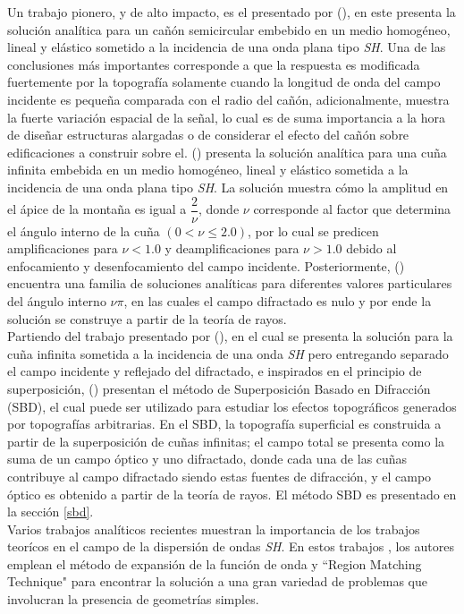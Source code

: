 \documentclass[spanish,letterpaper,12pt,twoside,openany]{article}
\begin{document}
Un trabajo pionero, y de alto impacto, es el presentado por \citeauthor{Trifunac1973} (\citeyear{Trifunac1973}), en este presenta la solución analítica para un cañón semicircular embebido en un medio homogéneo, lineal y elástico sometido a la incidencia de una onda plana tipo \textit{SH}. Una de las conclusiones más importantes corresponde a que la respuesta es modificada fuertemente por la topografía solamente cuando la longitud de onda del campo incidente es pequeña comparada con el radio del cañón, adicionalmente, muestra la fuerte variación espacial de la señal, lo cual es de suma importancia a la hora de diseñar estructuras alargadas o de considerar el efecto del cañón sobre edificaciones a construir sobre el. \citeauthor{SanchezSesma1985} (\citeyear{SanchezSesma1985}) presenta la solución analítica para una cuña infinita embebida en un medio homogéneo, lineal y elástico sometida a la incidencia de una onda plana tipo \textit{SH}. La solución muestra cómo la amplitud en el ápice de la montaña es igual a $\dfrac{2}{\nu}$, donde $\nu$ corresponde al factor que determina el ángulo interno de la cuña $\left( 0 < \nu \leqslant 2.0 \right)$, por lo cual se predicen amplificaciones para $\nu < 1.0$ y deamplificaciones para $\nu > 1.0$ debido al enfocamiento y desenfocamiento del campo incidente. Posteriormente, \citeauthor{SanchezSesma1990} (\citeyear{SanchezSesma1990}) encuentra una familia de soluciones analíticas para diferentes valores particulares del ángulo interno $\nu \pi$, en las cuales el campo difractado es nulo y por ende la solución se construye a partir de la teoría de rayos.\\
%
Partiendo del trabajo presentado por \citeauthor{Pathak1974} (\citeyear{Pathak1974}), en el cual se presenta la solución para la cuña infinita sometida a la incidencia de una onda \textit{SH} pero entregando separado el campo incidente y reflejado del difractado, e inspirados en el principio de superposición, \citeauthor{Jaramillo2013} (\citeyear{Jaramillo2013}) presentan el método de Superposición Basado en Difracción (SBD), el cual puede ser utilizado para estudiar los efectos topográficos generados por topografías arbitrarias. En el SBD, la topografía superficial es construida a partir de la superposición de cuñas infinitas; el campo total se presenta como la suma de un campo óptico y uno difractado, donde cada una de las cuñas contribuye al campo difractado siendo estas fuentes de difracción, y el campo óptico es obtenido a partir de la teoría de rayos. El método SBD es presentado en la sección \ref{sbd}.\\
%
Varios trabajos analíticos recientes muestran la importancia de los trabajos teorícos en el campo de la dispersión de ondas \textit{SH}. En estos trabajos \citep{Tsaur2008, Tsaur2010a, Tsaur2010b, Han2011, Zhang2012a, Zhang2012b, Gao2012, Tsaur2013, Chang2013}, los autores emplean el método de expansión de la función de onda y ``Region Matching Technique" para encontrar la solución a una gran variedad de problemas que involucran la presencia de geometrías simples.
\end{document}

